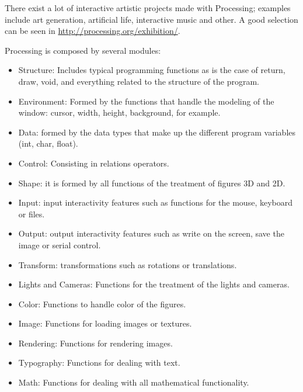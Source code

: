 There exist a lot of interactive artistic projects made with
Processing; examples include art generation, artificial life,
interactive music and other. A good selection can be seen in
\url{http://processing.org/exhibition/}. %

Processing is composed by several modules: %

\begin{itemize}
\item Structure: Includes typical programming functions as is the case of return, draw, void, and everything related to the structure of the program.
\item Environment: Formed by the functions that handle the modeling of the window: cursor, width, height, background, for example.
\item Data: formed by the data types that make up the different program variables (int, char, float).
\item Control: Consisting in relations operators.
\item Shape: it is formed by all functions of the treatment of figures 3D and 2D.
\item Input: input interactivity features such as functions for the mouse, keyboard or files.
\item Output: output interactivity features such as write on the screen, save the image or serial control.
\item Transform: transformations such as rotations or translations.
\item Lights and Cameras: Functions for the treatment of the lights and cameras.
\item Color: Functions to handle color of the figures.
\item Image: Functions for loading images or textures.
\item Rendering: Functions for rendering images.
\item Typography: Functions for dealing with text.
\item Math: Functions for dealing with all mathematical functionality.
\end{itemize}

